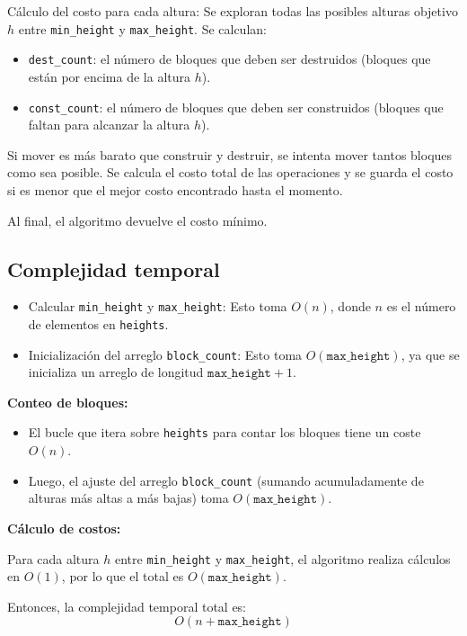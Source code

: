 \documentclass[a4paper,12pt]{article}
\begin{document}
Cálculo del costo para cada altura: Se exploran todas las posibles alturas objetivo \(h\) entre \texttt{min\_height} y \texttt{max\_height}. Se calculan:
\begin{itemize}
	\item \texttt{dest\_count}: el número de bloques que deben ser destruidos (bloques que están por encima de la altura \(h\)).
	\item \texttt{const\_count}: el número de bloques que deben ser construidos (bloques que faltan para alcanzar la altura \(h\)).
\end{itemize}

Si mover es más barato que construir y destruir, se intenta mover tantos bloques como sea posible. Se calcula el costo total de las operaciones y se guarda el costo si es menor que el mejor costo encontrado hasta el momento.

Al final, el algoritmo devuelve el costo mínimo.

\subsection{Complejidad temporal}
\begin{itemize}
	\item Calcular \texttt{min\_height} y \texttt{max\_height}: Esto toma \(O(n)\), donde \(n\) es el número de elementos en \texttt{heights}.
	\item Inicialización del arreglo \texttt{block\_count}: Esto toma \(O(\texttt{max\_height})\), ya que se inicializa un arreglo de longitud \(\texttt{max\_height}+1\).
\end{itemize}

\textbf{Conteo de bloques:}
\begin{itemize}
	\item El bucle que itera sobre \texttt{heights} para contar los bloques tiene un coste \(O(n)\).
	\item Luego, el ajuste del arreglo \texttt{block\_count} (sumando acumuladamente de alturas más altas a más bajas) toma \(O(\texttt{max\_height})\).
\end{itemize}

\textbf{Cálculo de costos:}

Para cada altura \(h\) entre \texttt{min\_height} y \texttt{max\_height}, el algoritmo realiza cálculos en \(O(1)\), por lo que el total es \(O(\texttt{max\_height})\).

Entonces, la complejidad temporal total es:
\[
O(n + \texttt{max\_height})
\]
\end{document}
